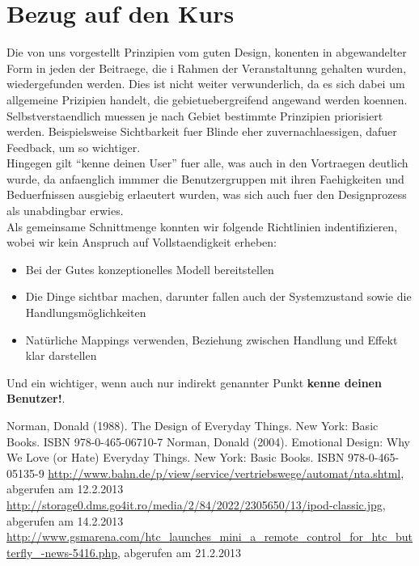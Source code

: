 \documentclass[parskip,headsepline, headtopline, %
footsepline, oneside, 12pt, headings=small]{scrreprt}
\begin{document}
\section{Bezug auf den Kurs}

Die von uns vorgestellt Prinzipien vom guten Design, konenten in abgewandelter Form in jeden der Beitraege, die i Rahmen der Veranstaltunng gehalten wurden, wiedergefunden werden. Dies ist nicht weiter verwunderlich, da es sich dabei um allgemeine Prizipien handelt, die gebietuebergreifend angewand werden koennen. Selbstverstaendlich muessen je nach Gebiet bestimmte Prinzipien priorisiert werden. Beispielsweise Sichtbarkeit fuer Blinde eher zuvernachlaessigen, dafuer Feedback, um so wichtiger.\\
Hingegen gilt "`kenne deinen User"' fuer alle, was auch in den Vortraegen deutlich wurde, da anfaenglich immmer die Benutzergruppen mit ihren Faehigkeiten und Beduerfnissen ausgiebig erlaeutert wurden, was sich auch fuer den Designprozess als unabdingbar erwies.  \\

Als gemeinsame Schnittmenge konnten wir folgende Richtlinien indentifizieren, wobei wir kein Anspruch auf Vollstaendigkeit erheben:
\begin{itemize}
\item Bei der Gutes konzeptionelles Modell bereitstellen
\item Die Dinge sichtbar machen, darunter fallen auch der Systemzustand sowie die Handlungsmöglichkeiten
\item Natürliche Mappings verwenden, Beziehung zwischen Handlung und Effekt klar darstellen
\end{itemize}

Und ein wichtiger, wenn auch nur indirekt genannter Punkt \textbf{kenne deinen Benutzer!}. 



\begin{thebibliography}{9}
	 Norman, Donald (1988). The Design of Everyday Things. New York: Basic Books. ISBN 978-0-465-06710-7 
	 Norman, Donald (2004). Emotional Design: Why We Love (or Hate) Everyday Things. New York: Basic Books. ISBN 978-0-465-05135-9
	 \url{http://www.bahn.de/p/view/service/vertriebswege/automat/nta.shtml}, abgerufen am 12.2.2013
	 \url{http://storage0.dms.go4it.ro/media/2/84/2022/2305650/13/ipod-classic.jpg}, abgerufen am 14.2.2013
	  \url{http://www.gsmarena.com/htc_launches_mini_a_remote_control_for_htc_butterfly_-news-5416.php}, abgerufen am 21.2.2013
\end{thebibliography}
\end{document}
